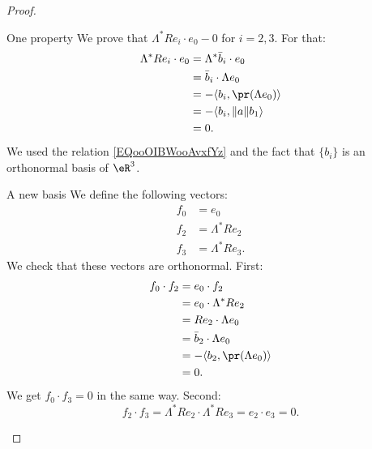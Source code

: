 \begin{proof}
\begin{subproof}
        \item[One property]
            We prove that \( \Lambda^*Re_i\cdot e_0-0\) for \( i=2,3\). For that:
            \begin{subequations}
                \begin{align}
                    \Lambda^*Re_i\cdot e_0&=\Lambda^*\bar b_i\cdot e_0\\
                    &=\bar b_i\cdot \Lambda e_0\\
                    &=-\langle b_i, \pr(\Lambda e_0)\rangle \\
                    &=-\langle b_i, \| a \|  b_1\rangle \\
                    &=0.
                \end{align}
            \end{subequations}
            We used the relation \eqref{EQooOIBWooAvxfYz} and the fact that \( \{ b_i \} \) is an orthonormal basis of \( \eR^3\).
        \item[A new basis]
            We define the following vectors:
            \begin{subequations}
                \begin{align}
                    f_0&=e_0\\
                    f_2&=\Lambda^*Re_2\\
                    f_3&=\Lambda^*Re_3.
                \end{align}
            \end{subequations}
            We check that these vectors are orthonormal. First:
            \begin{subequations}
                \begin{align}
                    f_0\cdot f_2&=e_0\cdot f_2\\
                    &=e_0\cdot \Lambda^*Re_2\\
                    &= Re_2\cdot \Lambda e_0\\
                    &=\bar b_2\cdot \Lambda e_0\\
                    &=-\langle b_2, \pr(\Lambda e_0)\rangle \\
                    &=0.
                \end{align}
            \end{subequations}
            We get \( f_0\cdot f_3=0\) in the same way. Second:
            \begin{equation}
                f_2\cdot f_3=\Lambda^*Re_2\cdot \Lambda^*Re_3=e_2\cdot e_3=0.

\end{equation}
\end{subproof}
\end{proof}
